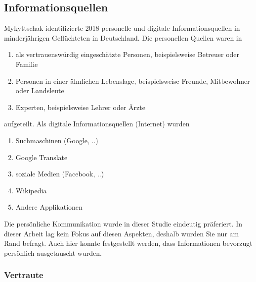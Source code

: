 \subsection{Informationsquellen}

Mykyttschak identifizierte 2018 personelle und digitale Informationsquellen in minderjährigen Geflüchteten in Deutschland.\newline
Die personellen Quellen waren in
\begin{enumerate}
    \item als vertrauenswürdig eingeschätzte Personen, beispielsweise Betreuer oder Familie
    \item Personen in einer ähnlichen Lebenslage, beispielsweise Freunde, Mitbewohner oder Landsleute
    \item Experten, beispielsweise Lehrer oder Ärzte
\end{enumerate}
aufgeteilt.\newline
Als digitale Informationsquellen (Internet) wurden
\begin{enumerate}
    \item Suchmaschinen (Google, ..)
    \item Google Translate
    \item soziale Medien (Facebook, ..)
    \item Wikipedia
    \item Andere Applikationen
\end{enumerate}
Die persönliche Kommunikation wurde in dieser Studie eindeutig präferiert.
In dieser Arbeit lag kein Fokus auf diesen Aspekten, deshalb wurden Sie nur am Rand befragt. Auch hier konnte festgestellt werden, dass Informationen bevorzugt persönlich ausgetauscht wurden.

\subsubsection{Vertraute}

